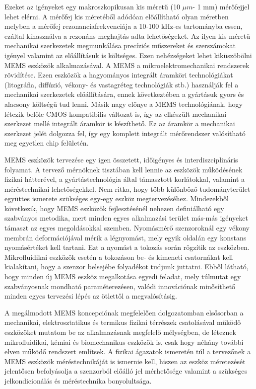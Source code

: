 Ezeket az igényeket egy makroszkopikusan kis méretű (10 $\mu m$- 1 mm) mérőfejjel lehet elérni. A mérőfej kis méretéből adódóan előállítható olyan méretben melyben a mérőfej rezonanciafrekvenciája a 10-100 kHz-es tartományba essen, ezáltal kihasználva a rezonáns meghajtás adta lehetőségeket. Az ilyen kis méretű mechanikai szerkezetek megmunkálása precíziós műszereket és szerszámokat igényel valamint az előállításuk is költséges. Ezen nehézségeket lehet kiküszöbölni MEMS eszközök alkalmazásával. A MEMS a mikroelektromechanikai rendszerek rövidítése. Ezen eszközök a hagyományos integrált áramköri technológiákat (litográfia, diffúzió, vékony- és vastagréteg technológiák stb.) használják fel a mechanikai szerkezetek előállítására, ennek következtében a gyártásuk gyors és alacsony költségű tud lenni. Másik nagy előnye a MEMS technológiának, hogy létezik belőle CMOS kompatibilis változat is, így az elkészült mechanikai szerkezet mellé integrált áramkör is készíthető. Ez az áramkör a mechanikai szerkezet jelét dolgozza fel, így egy komplett integrált mérőrendszer valósítható meg egyetlen chip felületén.

MEMS eszközök tervezése egy igen összetett, időigényes és interdiszciplináris folyamat. A tervező mérnöknek tisztában kell lennie az eszközök működésének fizikai hátterével, a gyártástechnológia által támasztott korlátokkal, valamint a méréstechnikai lehetőségekkel. Nem ritka, hogy több különböző tudományterület együttes ismerete szükséges egy-egy eszköz megtervezéséhez. Mindezekből következik, hogy MEMS eszközök fejlesztésénél nehezen definiálható egy szabványos metodika, mert minden egyes alkalmazási terület más-más igényeket támaszt az egyes megoldásokkal szemben. Nyomásmérő szenzoroknál egy vékony membrán deformációjával mérik a légnyomást, mely egyik oldalán egy konstans nyomásértéket kell tartani. Ezt a nyomást a tokozás során rögzítik az eszközben. Mikrofluidikai eszközök esetén a tokozáson be- és kimeneti csatornákat kell kialakítani, hogy a szenzor belsejébe folyadékot tudjunk juttatni. Ebből látható, hogy minden új MEMS eszköz megalkotása egyedi feladat, mely túlmutat egy szabványosnak mondható paraméterezésen, valódi innovációnak minősíthető minden egyes tervezési lépés az ötlettől a megvalósításig.

A megálmodott MEMS koncepciónak megfelelően dolgozatomban elsősorban a mechanikai, elektrosztatikus és termikus fizikai térrészek csatolásával működő eszközöket mutatom be az alkalmazásnak megfelelő mélységben, de léteznek mikrofluidikai\cite{microfluidicMEMS}, kémiai\cite{chemicalMEMS} és biomechanikus\cite{bioMEMS} eszközök is, csak hogy néhány további elven működő rendszert említsek. A fizikai ágazatok ismeretén túl a tervezőnek a MEMS eszközök méréstechnikáját is ismernie kell, hiszen az eszköz méretezését jelentősen befolyásolja a szenzorból előálló jel mérhetősége valamint a szükséges jelkondicionálás és méréstechnika bonyolultsága.

